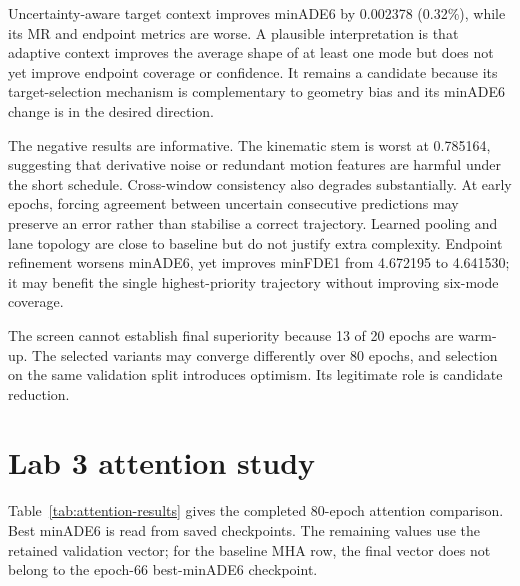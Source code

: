 Uncertainty-aware target context improves minADE6 by 0.002378 (0.32\%), while its MR and endpoint metrics are worse. A plausible interpretation is that adaptive context improves the average shape of at least one mode but does not yet improve endpoint coverage or confidence. It remains a candidate because its target-selection mechanism is complementary to geometry bias and its minADE6 change is in the desired direction.

The negative results are informative. The kinematic stem is worst at 0.785164, suggesting that derivative noise or redundant motion features are harmful under the short schedule. Cross-window consistency also degrades substantially. At early epochs, forcing agreement between uncertain consecutive predictions may preserve an error rather than stabilise a correct trajectory. Learned pooling and lane topology are close to baseline but do not justify extra complexity. Endpoint refinement worsens minADE6, yet improves minFDE1 from 4.672195 to 4.641530; it may benefit the single highest-priority trajectory without improving six-mode coverage.

The screen cannot establish final superiority because 13 of 20 epochs are warm-up. The selected variants may converge differently over 80 epochs, and selection on the same validation split introduces optimism. Its legitimate role is candidate reduction.

\section{Lab 3 attention study}

Table~\ref{tab:attention-results} gives the completed 80-epoch attention comparison. Best minADE6 is read from saved checkpoints. The remaining values use the retained validation vector; for the baseline MHA row, the final vector does not belong to the epoch-66 best-minADE6 checkpoint.

\begin{table}[htbp]
\centering
\caption{Lab 3 attention results on AV2. All variants share the same 80-epoch, global-batch-24 controls.}
\label{tab:attention-results}
\end{table}

